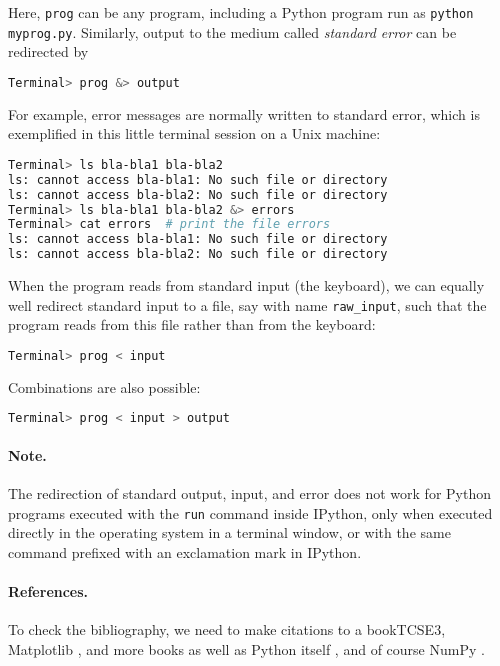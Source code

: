 \documentclass[graybox,sectrefs,envcountresetchap,open=right,final]{svmonodo}
\begin{document}
Here, \texttt{prog} can be any
program, including a Python program run as \texttt{python myprog.py}.
Similarly, output to the medium called \emph{standard error}
can be redirected by
\begin{lstlisting}[language=bash,style=simple,xleftmargin=2mm]
Terminal> prog &> output

\end{lstlisting}

For example, error messages are normally written to standard error, which
is exemplified in this little terminal session on a Unix machine:
\begin{lstlisting}[language=bash,style=simple,xleftmargin=2mm]
Terminal> ls bla-bla1 bla-bla2
ls: cannot access bla-bla1: No such file or directory
ls: cannot access bla-bla2: No such file or directory
Terminal> ls bla-bla1 bla-bla2 &> errors
Terminal> cat errors  # print the file errors
ls: cannot access bla-bla1: No such file or directory
ls: cannot access bla-bla2: No such file or directory

\end{lstlisting}

When the program reads from standard input (the keyboard),
we can equally well redirect
standard input to a file, say with name \Verb!raw_input!, such that
the program reads from this file rather than from the keyboard:
\begin{lstlisting}[language=bash,style=simple,xleftmargin=2mm]
Terminal> prog < input

\end{lstlisting}

Combinations are also possible:
\begin{lstlisting}[language=bash,style=simple,xleftmargin=2mm]
Terminal> prog < input > output

\end{lstlisting}

\paragraph{Note.}
The redirection of standard output, input, and error
does not work for Python programs executed with the \texttt{run}
command inside IPython, only when executed directly
in the operating system in a terminal window, or with the same
command prefixed with an exclamation mark in IPython.
\paragraph{References.}
To check the bibliography, we need to make citations to a book{TCSE3},
Matplotlib \cite{Matplotlib:paper}, and more books \cite{Mertz,PythonQt}
as well as Python itself \cite{Python}, and of course NumPy
\cite{NumPy}.
\end{document}
